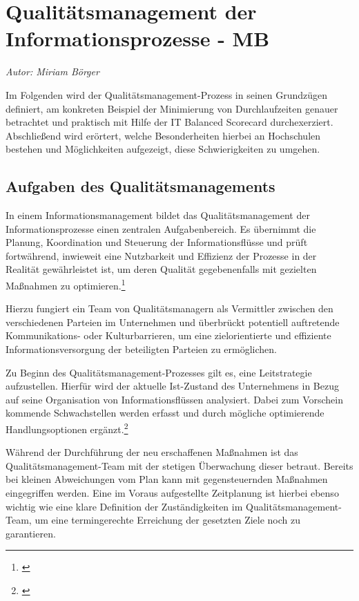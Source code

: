 \section{Qualitätsmanagement der Informationsprozesse - MB}
\textit{Autor: Miriam Börger}


Im Folgenden wird der Qualitätsmanagement-Prozess in seinen Grundzügen definiert, am konkreten Beispiel der Minimierung von Durchlaufzeiten genauer betrachtet und praktisch mit Hilfe der IT Balanced Scorecard durchexerziert. 
Abschließend wird erörtert, welche Besonderheiten hierbei an Hochschulen bestehen und Möglichkeiten aufgezeigt, diese Schwierigkeiten zu umgehen.

\subsection{Aufgaben des Qualitätsmanagements}
In einem Informationsmanagement bildet das Qualitätsmanagement der Informationsprozesse einen zentralen Aufgabenbereich. Es übernimmt die Planung, Koordination und Steuerung der Informationsflüsse und prüft fortwährend, inwieweit eine Nutzbarkeit und Effizienz der Prozesse in der Realität gewährleistet ist, um deren Qualität gegebenenfalls mit gezielten Maßnahmen zu optimieren.\footnote{\cite{schroder_wertorientiertes_2005}}

Hierzu fungiert ein Team von Qualitätsmanagern als Vermittler zwischen den verschiedenen Parteien im Unternehmen und überbrückt potentiell auftretende Kommunikations- oder Kulturbarrieren, um eine zielorientierte und effiziente Informationsversorgung der beteiligten Parteien zu ermöglichen.

Zu Beginn des Qualitätsmanagement-Prozesses gilt es, eine Leitstrategie aufzustellen. Hierfür wird der aktuelle Ist-Zustand des Unternehmens in Bezug auf seine Organisation von Informationsflüssen analysiert. Dabei zum Vorschein kommende Schwachstellen werden erfasst und durch mögliche optimierende Handlungsoptionen ergänzt.\footnote{\cite{helmke_management_2013}}

Während der Durchführung der neu erschaffenen Maßnahmen ist das Qualitätsmanagement-Team mit der stetigen Überwachung dieser betraut. 
Bereits bei kleinen Abweichungen vom Plan kann mit gegensteuernden Maßnahmen eingegriffen werden. 
Eine im Voraus aufgestellte Zeitplanung ist hierbei ebenso wichtig wie eine klare Definition der Zuständigkeiten im Qualitätsmanagement-Team, um eine termingerechte Erreichung der gesetzten Ziele noch zu garantieren.

